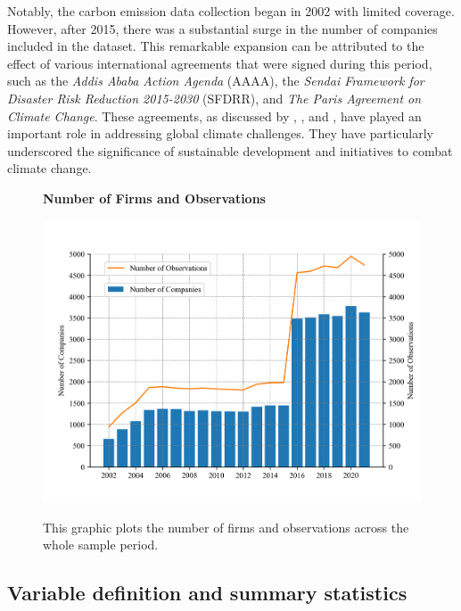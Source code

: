 \documentclass[12pt]{article}
\begin{document}
Notably, the carbon emission data collection began in 2002 with limited coverage. However, after 2015, there was a substantial surge in the number of companies included in the dataset. This remarkable expansion can be attributed to the effect of various international agreements that were signed during this period, such as the \textit{Addis Ababa Action Agenda} (AAAA), the \textit{Sendai Framework for Disaster Risk Reduction 2015-2030} (SFDRR), and \textit{The Paris Agreement on Climate Change}. These agreements, as discussed by \cite{engberg2021influence}, \cite{kelman2015climate}, and \cite{dimitrov2016paris}, have played an important role in addressing global climate challenges. They have particularly underscored the significance of sustainable development and initiatives to combat climate change.

\begin{figure}[!ht]
\centering
\caption{\textbf{Number of Firms and Observations}}
\includegraphics{graphics/number_obs.png}
\label{fig: num}
\caption*{\footnotesize{This graphic plots the number of firms and observations across the whole sample period.}}
\end{figure}

\subsection{Variable definition and summary statistics}
\end{document}
